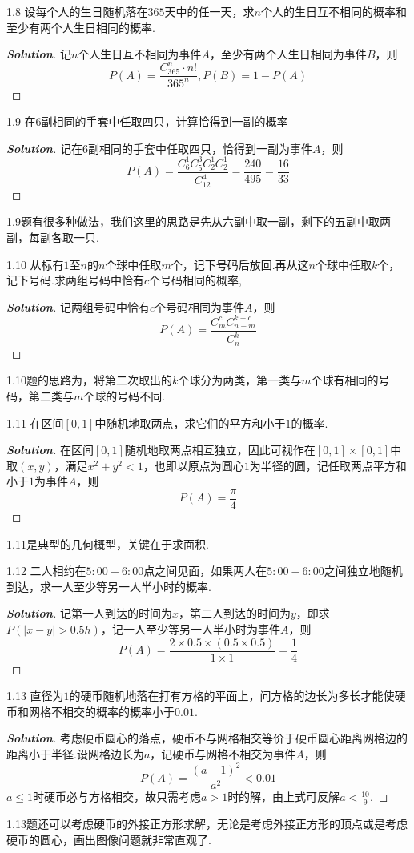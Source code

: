 \documentclass[10pt, a4paper, oneside]{ctexart}
\newenvironment{solution}{\begin{proof}[\bf Solution]}{\end{proof}}
\begin{document}
1.8 设每个人的生日随机落在$365$天中的任一天，求$n$个人的生日互不相同的概率和至少有两个人生日相同的概率.
\begin{solution}
记$n$个人生日互不相同为事件$A$，至少有两个人生日相同为事件$B$，则
\[P(A) = \frac{{C_{365}^n}\cdot n!}{{{{365}^n}}},P(B) = 1 - P(A)\]
\end{solution}


1.9 在$6$副相同的手套中任取四只，计算恰得到一副的概率
\begin{solution}
记在$6$副相同的手套中任取四只，恰得到一副为事件$A$，则
\[P(A) = \frac{{C_6^1C_5^3C_2^1C_2^1}}{{C_{12}^4}} = \frac{{240}}{{495}} = \frac{{16}}{{33}}\]
\end{solution}
\begin{remark}
1.9题有很多种做法，我们这里的思路是先从六副中取一副，剩下的五副中取两副，每副各取一只.
\end{remark}

1.10 从标有$1$至$n$的$n$个球中任取$m$个，记下号码后放回.再从这$n$个球中任取$k$个，记下号码.求两组号码中恰有$c$个号码相同的概率,
\begin{solution}
记两组号码中恰有$c$个号码相同为事件$A$，则
\[P(A) = \frac{{C_m^cC_{n - m}^{k - c}}}{{C_n^k}}\]
\end{solution}
\begin{remark}
1.10题的思路为，将第二次取出的$k$个球分为两类，第一类与$m$个球有相同的号码，第二类与$m$个球的号码不同.
\end{remark}

1.11 在区间$[0,1]$中随机地取两点，求它们的平方和小于$1$的概率.
\begin{solution}
在区间$[0,1]$随机地取两点相互独立，因此可视作在$[0,1]\times [0,1]$中取$(x,y)$，满足$x^2+y^2<1$，也即以原点为圆心$1$为半径的圆，记任取两点平方和小于$1$为事件$A$，则
\[
P(A)=\frac{\pi}{4}
\]
\end{solution}
\begin{remark}
1.11是典型的几何概型，关键在于求面积.
\end{remark}

1.12 二人相约在$5:00-6:00$点之间见面，如果两人在$5:00-6:00$之间独立地随机到达，求一人至少等另一人半小时的概率.
\begin{solution}
记第一人到达的时间为$x$，第二人到达的时间为$y$，即求$P(|x-y|>0.5h)$，记一人至少等另一人半小时为事件$A$，则
\[P(A) = \frac{{2 \times 0.5 \times (0.5 \times 0.5)}}{1\times 1} = \frac{1}{4}\]
\end{solution}

1.13 直径为$1$的硬币随机地落在打有方格的平面上，问方格的边长为多长才能使硬币和网格不相交的概率的概率小于$0.01$.
\begin{solution}
考虑硬币圆心的落点，硬币不与网格相交等价于硬币圆心距离网格边的距离小于半径.设网格边长为$a$，记硬币与网格不相交为事件$A$，则
\[P(A) = \frac{{{{(a - 1)}^2}}}{{{a^2}}} < 0.01\]
$a\leqslant 1$时硬币必与方格相交，故只需考虑$a>1$时的解，由上式可反解$a<\frac{10}{9}$.
\end{solution}
\begin{remark}
 1.13题还可以考虑硬币的外接正方形求解，无论是考虑外接正方形的顶点或是考虑硬币的圆心，画出图像问题就非常直观了.   
\end{remark}
\end{document}

